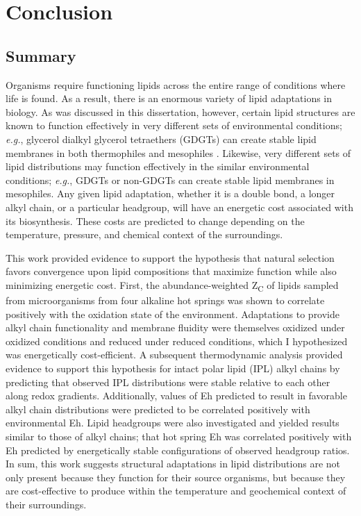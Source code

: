 \chapter[CONCLUSION]{Conclusion}

\section{Summary}

Organisms require functioning lipids across the entire range of conditions where life is found. As a result, there is an enormous variety of lipid adaptations in biology. As was discussed in this dissertation, however, certain lipid structures are known to function effectively in very different sets of environmental conditions; \textit{e.g.}, glycerol dialkyl glycerol tetraethers (GDGTs) can create stable lipid membranes in both thermophiles and mesophiles \citep{schouten2000widespread}. Likewise, very different sets of lipid distributions may function effectively in the similar environmental conditions; \textit{e.g.}, GDGTs or non-GDGTs can create stable lipid membranes in mesophiles. Any given lipid adaptation, whether it is a double bond, a longer alkyl chain, or a particular headgroup, will have an energetic cost associated with its biosynthesis. These costs are predicted to change depending on the temperature, pressure, and chemical context of the surroundings.

This work provided evidence to support the hypothesis that natural selection favors convergence upon lipid compositions that maximize function while also minimizing energetic cost. First, the abundance-weighted Z\textsubscript{C} of lipids sampled from microorganisms from four alkaline hot springs was shown to correlate positively with the oxidation state of the environment. Adaptations to provide alkyl chain functionality and membrane fluidity were themselves oxidized under oxidized conditions and reduced under reduced conditions, which I hypothesized was energetically cost-efficient. A subsequent thermodynamic analysis provided evidence to support this hypothesis for intact polar lipid (IPL) alkyl chains by predicting that observed IPL distributions were stable relative to each other along redox gradients. Additionally, values of Eh predicted to result in favorable alkyl chain distributions were predicted to be correlated positively with environmental Eh. Lipid headgroups were also investigated and yielded results similar to those of alkyl chains; that hot spring Eh was correlated positively with Eh predicted by energetically stable configurations of observed headgroup ratios. In sum, this work suggests structural adaptations in lipid distributions are not only present because they function for their source organisms, but because they are cost-effective to produce within the temperature and geochemical context of their surroundings.

